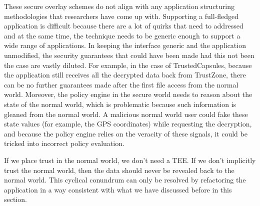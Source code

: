 These secure overlay schemes do not align with any application structuring methodologies that researchers have come up with. Supporting a full-fledged application is difficult because there are a lot of quirks that need to addressed and at the same time, the technique needs to be generic enough to support a wide range of applications. In keeping the interface generic and the application unmodified, the security guarantees that could have been made had this not been the case are vastly diluted. For example, in the case of TrustedCapsules, because the application still receives all the decrypted data back from TrustZone, there can be no further guarantees made after the first file access from the normal world. Moreover, the policy engine in the secure world needs to reason about the state of the normal world, which is problematic because such information is gleaned from the normal world. A malicious normal world user could fake these state values (for example, the GPS coordinates) while requesting the decryption, and because the policy engine relies on the veracity of these signals, it could be tricked into incorrect policy evaluation. 

If we place trust in the normal world, we don't need a TEE. If we don't implicitly trust the normal world, then the data should never be revealed back to the normal world. This cyclical conundrum can only be resolved by refactoring the application in a way consistent with what we have discussed before in this section.